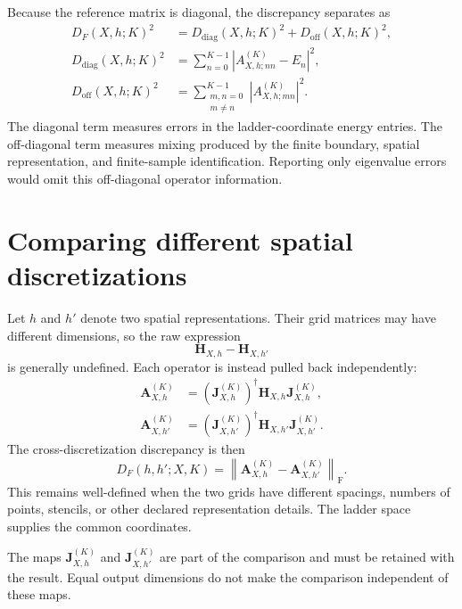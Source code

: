 Because the reference matrix is diagonal, the discrepancy separates as
\begin{align}
    D_F(X,h;K)^2
    &=
    D_{\mathrm{diag}}(X,h;K)^2
    +
    D_{\mathrm{off}}(X,h;K)^2,
    \\
    D_{\mathrm{diag}}(X,h;K)^2
    &=
    \sum_{n=0}^{K-1}
    \left|
        A_{X,h;nn}^{(K)}-E_n
    \right|^2,
    \\
    D_{\mathrm{off}}(X,h;K)^2
    &=
    \sum_{\substack{m,n=0\\m\neq n}}^{K-1}
    \left|
        A_{X,h;mn}^{(K)}
    \right|^2.
\end{align}
The diagonal term measures errors in the ladder-coordinate energy entries. The
off-diagonal term measures mixing produced by the finite boundary, spatial
representation, and finite-sample identification. Reporting only eigenvalue
errors would omit this off-diagonal operator information.

\section*{Comparing different spatial discretizations}

Let $h$ and $h'$ denote two spatial representations. Their grid matrices may
have different dimensions, so the raw expression
\begin{equation}
    \mathbf H_{X,h}-\mathbf H_{X,h'}
\end{equation}
is generally undefined. Each operator is instead pulled back independently:
\begin{align}
    \mathbf A_{X,h}^{(K)}
    &=
    \left(\mathbf J_{X,h}^{(K)}\right)^\dagger
    \mathbf H_{X,h}
    \mathbf J_{X,h}^{(K)},
    \\
    \mathbf A_{X,h'}^{(K)}
    &=
    \left(\mathbf J_{X,h'}^{(K)}\right)^\dagger
    \mathbf H_{X,h'}
    \mathbf J_{X,h'}^{(K)}.
\end{align}
The cross-discretization discrepancy is then
\begin{equation}
    D_F(h,h';X,K)
    =
    \left\lVert
        \mathbf A_{X,h}^{(K)}
        -
        \mathbf A_{X,h'}^{(K)}
    \right\rVert_{\mathrm F}.
\end{equation}
This remains well-defined when the two grids have different spacings, numbers
of points, stencils, or other declared representation details. The ladder
space supplies the common coordinates.

The maps $\mathbf J_{X,h}^{(K)}$ and $\mathbf J_{X,h'}^{(K)}$ are part of the
comparison and must be retained with the result. Equal output dimensions do not
make the comparison independent of these maps.

